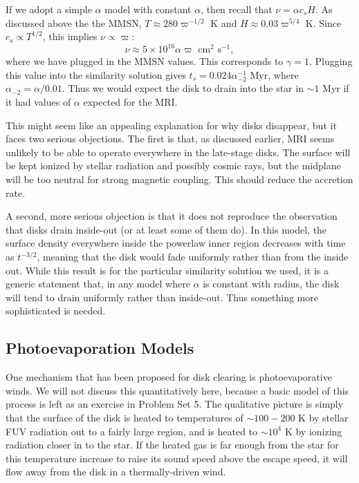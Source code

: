 If we adopt a simple $\alpha$ model with constant $\alpha$, then recall that $\nu = \alpha c_s H$. As discussed above the the MMSN, $T \approx 280 \varpi^{-1/2}$ K and $H \approx 0.03 \varpi^{5/4}$ K. Since $c_s\propto T^{1/2}$, this implies $\nu\propto \varpi$:
\begin{equation}
\nu \approx 5\times 10^{16} \alpha \varpi\mbox{ cm}^2\mbox{ s}^{-1},
\end{equation}
where we have plugged in the MMSN values. This corresponds to $\gamma = 1$. Plugging this value into the similarity solution gives $t_s = 0.024\alpha_{-2}^{-1}\mbox{ Myr}$, where $\alpha_{-2} = \alpha/0.01$. Thus we would expect the disk to drain into the star in $\sim 1$ Myr if it had values of $\alpha$ expected for the MRI.

This might seem like an appealing explanation for why disks disappear, but it faces two serious objections. The first is that, as discussed earlier, MRI seems unlikely to be able to operate everywhere in the late-stage disks. The surface will be kept ionized by stellar radiation and possibly cosmic rays, but the midplane will be too neutral for strong magnetic coupling. This should reduce the accretion rate.

A second, more serious objection is that it does not reproduce the observation that disks drain inside-out (or at least some of them do). In this model, the surface density everywhere inside the powerlaw inner region decreases with time as $t^{-3/2}$, meaning that the disk would fade uniformly rather than from the inside out. While this result is for the particular similarity solution we used, it is a generic statement that, in any model where $\alpha$ is constant with radius, the disk will tend to drain uniformly rather than inside-out. Thus something more sophisticated is needed.


\subsection{Photoevaporation Models}

One mechanism that has been proposed for disk clearing is photoevaporative winds. We will not discuss this quantitatively here, because a basic model of this process is left as an exercise in Problem Set 5. The qualitative picture is simply that the surface of the disk is heated to temperatures of $\sim 100-200$ K by stellar FUV radiation out to a fairly large region, and is heated to $\sim 10^4$ K by ionizing radiation closer in to the star. If the heated gas is far enough from the star for this temperature increase to raise its sound speed above the escape speed, it will flow away from the disk in a thermally-driven wind.

